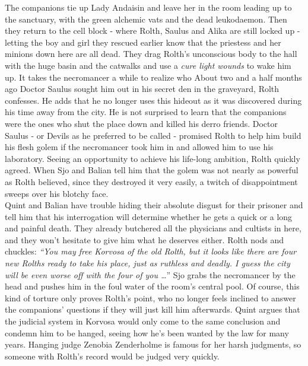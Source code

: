 The companions tie up Lady Andaisin and leave her in the room leading up to the sanctuary, with the green alchemic vats and the dead leukodaemon. Then they return to the cell block - where Rolth, Saulus and Alika are still locked up - letting the boy and girl they rescued earlier know that the priestess and her minions down here are all dead. They drag Rolth's unconscious body to the hall with the huge basin and the catwalks and use a {\itshape cure light wounds} to wake him up. It takes the necromancer a while to realize who About two and a half months ago Doctor Saulus sought him out in his secret den in the graveyard, Rolth confesses. He adds that he no longer uses this hideout as it was discovered during his time away from the city. He is not surprised to learn that the companions were the ones who shut the place down and killed his derro friends. Doctor Saulus - or Devils as he preferred to be called - promised Rolth to help him build his flesh golem if the necromancer took him in and allowed him to use his laboratory. Seeing an opportunity to achieve his life-long ambition, Rolth quickly agreed. When Sjo and Balian tell him that the golem was not nearly as powerful as Rolth believed, since they destroyed it very easily, a twitch of disappointment sweeps over his blotchy face.\\

Quint and Balian have trouble hiding their absolute disgust for their prisoner and tell him that his interrogation will determine whether he gets a quick or a long and painful death. They already butchered all the physicians and cultists in here, and they won't hesitate to give him what he deserves either. Rolth nods and chuckles: {\itshape``You may free Korvosa of the old Rolth, but it looks like there are four new Rolths ready to take his place, just as ruthless and deadly. I guess the city will be even worse off with the four of you \ldots}'' Sjo grabs the necromancer by the head and pushes him in the foul water of the room's central pool. Of course, this kind of torture only proves Rolth's point, who no longer feels inclined to answer the companions' questions if they will just kill him afterwards. Quint argues that the judicial system in Korvosa would only come to the same conclusion and condemn him to be hanged, seeing how he's been wanted by the law for many years. Hanging judge Zenobia Zenderholme is famous for her harsh judgments, so someone with Rolth's record would be judged very quickly.\\

